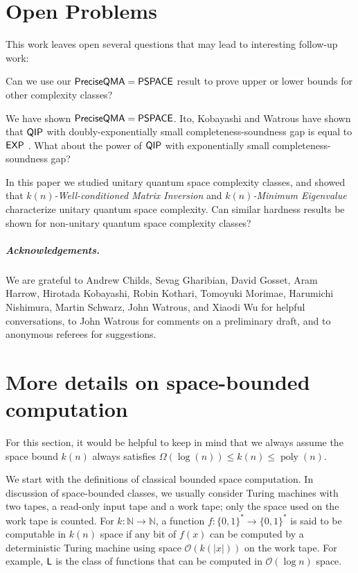 \documentclass[a4paper,UKenglish]{lipics-v2016}
\newcommand\EXP{{\sf{EXP}}}
\newcommand\QIP{{\sf{QIP}}}
\newcommand\PSPACE{{\sf{PSPACE}}}
\newcommand\Logspace{{\sf{L}}}
\newcommand\preciseQMA{{\sf{PreciseQMA}}}
\newcommand\matrixinvert[1]{{\ensuremath{#1}}\textit{-Well-conditioned Matrix Inversion}}
\newcommand\spechamiltonian[1]{\ensuremath{#1}\textit{-Minimum Eigenvalue}}
\newcommand\bigoh{\mathcal{O}}
\DeclareMathOperator{\poly}{poly}
\begin{document}
\section{Open Problems}
This work leaves open several questions that may lead to interesting follow-up work:
\begin{compactenum}
\begin{item} Can we use our $\preciseQMA=\PSPACE$ result to prove upper or lower bounds for other complexity classes? \end{item}
\begin{item} We have shown $\preciseQMA=\PSPACE$.  Ito, Kobayashi and Watrous  have shown that $\QIP$ with doubly-exponentially small completeness-soundness gap is equal to $\EXP$ \cite{ikw12}.  What about the power of $\QIP$ with exponentially small completeness-soundness gap?\end{item}
\begin{item}In this paper we studied unitary quantum space complexity classes, and showed that \matrixinvert{k(n)} and \spechamiltonian{k(n)} characterize unitary quantum space complexity.  Can similar hardness results be shown for non-unitary quantum space complexity classes?\end{item}
\end{compactenum}



\subparagraph*{Acknowledgements.}

We are grateful to Andrew Childs, Sevag Gharibian, David Gosset, Aram Harrow, Hirotada Kobayashi, Robin Kothari, Tomoyuki Morimae, Harumichi Nishimura, Martin Schwarz, John Watrous, and Xiaodi Wu for helpful conversations, to John Watrous for comments on a preliminary draft, and to anonymous referees for suggestions.

\appendix
\section{More details on space-bounded computation}\label{app: space bounded}
For this section, it would be helpful to keep in mind that we always assume the space bound $k(n)$ always satisfies $\Omega(\log(n)) \le k(n) \le \poly(n)$.

We start with the definitions of classical bounded space computation. In discussion of space-bounded classes, we usually consider Turing machines with two tapes, a read-only input tape and a work tape; only the space used on the work tape is counted. For $k:\mathbb{N}\rightarrow\mathbb{N}$, a function $f:\{0,1\}^{*}\rightarrow\{0,1\}^*$ is said to be computable in $k(n)$ space if any bit of $f(x)$ can be computed by a deterministic Turing machine using space $\bigoh(k(|x|))$ on the work tape.  For example, $\Logspace$ is the class of functions that can be computed in $\bigoh(\log{n})$ space.
\end{document}
